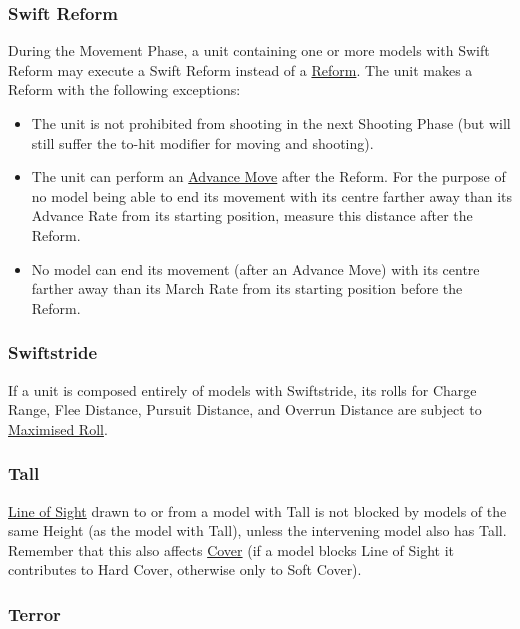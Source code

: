 \subsubsection{Swift Reform}
\label{swift_reform}

During the Movement Phase, a unit containing one or more models with Swift Reform may execute a Swift Reform instead of a \hyperref[reform]{Reform}. The unit makes a Reform with the following exceptions:
\begin{itemize}
\item The unit is not prohibited from shooting in the next Shooting Phase (but will still suffer the to-hit modifier for moving and shooting).
\item The unit can perform an \hyperref[advance_move]{Advance Move} after the Reform. For the purpose of no model being able to end its movement with its centre farther away than its Advance Rate from its starting position, measure this distance after the Reform.
\item No model can end its movement (after an Advance Move) with its centre farther away than its March Rate from its starting position before the Reform.
\end{itemize}

\subsubsection{Swiftstride}
\idx[main=y]{\swiftstride}\label{swiftstride}

If a unit is composed entirely of models with Swiftstride, its rolls for Charge Range, Flee Distance, Pursuit Distance, and Overrun Distance are subject to \hyperref[maximised_roll]{Maximised Roll}.

\subsubsection{Tall}
\idx[main=y]{\tall}\label{tall}

\hyperref[line_of_sight]{Line of Sight} drawn to or from a model with Tall is not blocked by models of the same Height (as the model with Tall), unless the intervening model also has Tall. Remember that this also affects \hyperref[cover]{Cover} (if a model blocks Line of Sight it contributes to Hard Cover, otherwise only to Soft Cover).

\subsubsection{Terror}
\idx[main=y]{\terror}\label{terror}

